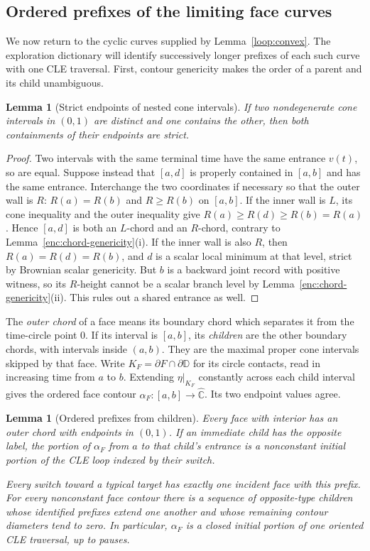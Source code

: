 \documentclass[11pt]{article}
\numberwithin{equation}{section}
\newtheorem{lemma}[theorem]{Lemma}
\theoremstyle{definition}
\theoremstyle{remark}
\newcommand{\1}{\mathbf 1}
\begin{document}
\subsection{Ordered prefixes of the limiting face curves}

We now return to the cyclic curves supplied by
Lemma~\ref{loop:convex}.  The exploration dictionary will identify
successively longer prefixes of each such curve with one CLE
traversal.  First, contour genericity makes the order of a parent
and its child unambiguous.

\begin{lemma}[Strict endpoints of nested cone intervals]
\label{loop:strict-endpoints}
If two nondegenerate cone intervals in $(0,1)$ are distinct and one
contains the other, then both containments of their endpoints are strict.
\end{lemma}

\begin{proof}
Two intervals with the same terminal time have the same entrance
$v(t)$, so are equal.  Suppose instead that $[a,d]$ is properly
contained in $[a,b]$ and has the same entrance.  Interchange the two
coordinates if necessary so that the outer wall is $R$:
$R(a)=R(b)$ and $R\ge R(b)$ on $[a,b]$.
If the inner wall is $L$, its cone inequality and the outer inequality
give $R(a)\ge R(d)\ge R(b)=R(a)$.  Hence $[a,d]$ is both an
$L$-chord and an $R$-chord, contrary to
Lemma~\ref{enc:chord-genericity}(i).
If the inner wall is also $R$, then
$R(a)=R(d)=R(b)$, and $d$ is a scalar local minimum at that level,
strict by Brownian scalar genericity.
But $b$ is a backward joint record with positive witness, so its
$R$-height cannot be a scalar branch level by
Lemma~\ref{enc:chord-genericity}(ii).  This rules out a shared entrance
as well.
\end{proof}

The \emph{outer chord} of a face means its boundary chord which separates
it from the time-circle point $0$.  If its interval is $[a,b]$, its
\emph{children} are the other boundary chords, with intervals inside
$(a,b)$.  They are the maximal proper cone intervals skipped by that
face.  Write $K_F=\partial F\cap\partial\mathbb D$ for its circle
contacts, read in increasing time from $a$ to $b$.  Extending
$\eta|_{K_F}$ constantly across each child interval gives the ordered
face contour $\alpha_F:[a,b]\to\widehat{\mathbb C}$.  Its two endpoint values agree.

\begin{lemma}[Ordered prefixes from children]\label{loop:prefixes}
Every face with interior has an outer chord with endpoints in $(0,1)$.
If an immediate child has the opposite label, the portion of
$\alpha_F$ from $a$ to that child's entrance is a nonconstant initial
portion of the CLE loop indexed by their switch.

Every switch toward a typical target has exactly one incident face
with this prefix.  For every nonconstant face contour there is a
sequence of opposite-type children whose identified prefixes extend
one another and whose remaining contour diameters tend to zero.
In particular, $\alpha_F$ is a closed initial portion of one oriented
CLE traversal, up to pauses.
\end{lemma}
\end{document}
